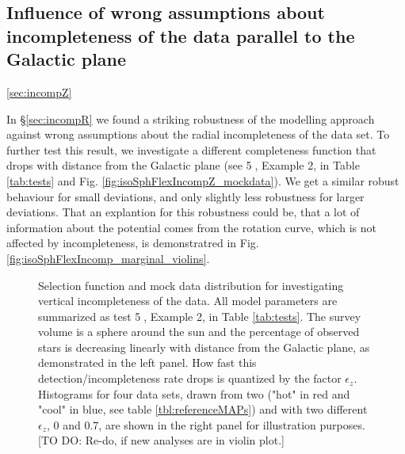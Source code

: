 \subsection{Influence of wrong assumptions about incompleteness of the data parallel to the Galactic plane} \ref{sec:incompZ}

In \S\ref{sec:incompR} we found a striking robustness of the \RM modelling approach against wrong assumptions about the radial incompleteness of the data set. To further test this result, we investigate a different completeness function that drops with distance from the Galactic plane (see \textcircled{5}, Example 2, in Table \ref{tab:tests} and Fig. \ref{fig:isoSphFlexIncompZ_mockdata}). We get a similar robust behaviour for small deviations, and only slightly less robustness for larger deviations. That an explantion for this robustness could be, that a lot of information about the potential comes from the rotation curve, which is not affected by incompleteness, is demonstratred in Fig. \ref{fig:isoSphFlexIncomp_marginal_violins}.


\begin{figure}
\caption{Selection function and mock data distribution for investigating vertical incompleteness of the data. All model parameters are summarized as test \textcircled{5}, Example 2, in Table \ref{tab:tests}. The survey volume is a sphere around the sun and the percentage of observed stars is decreasing linearly with distance from the Galactic plane, as demonstrated in the left panel. How fast this detection/incompleteness rate drops is quantized by the factor $\epsilon_z$. Histograms for four data sets, drawn from two \MAPs ("hot" in red and "cool" in blue, see table \ref{tbl:referenceMAPs}) and with two different $\epsilon_z$, 0 and 0.7, are shown in the right panel for illustration purposes. [TO DO: Re-do, if new analyses are in violin plot.]} 
\label{fig:incompZ_mockdata}
\end{figure}


